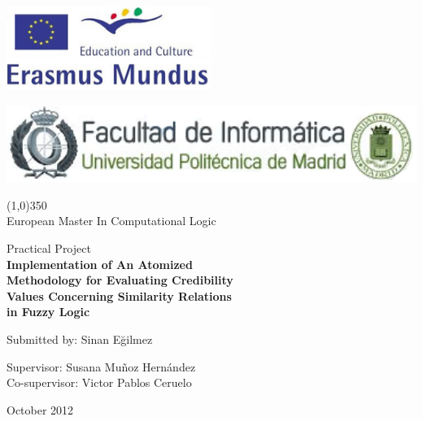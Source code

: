 
\begin{titlepage}
\centering

\includegraphics[width=0.5\textwidth]{erasmusMundus.png}

\includegraphics[width=1\textwidth]{logofi.png}
\begin{center}
\line(1,0){350}\\
European Master In Computational Logic
\end{center}

\vfill



{\large Practical Project}\\
\vspace{1cm}
{\huge {\sffamily\bfseries Implementation of An Atomized} } \\
\vspace{0.3cm}
{\huge{ \sffamily\bfseries Methodology for Evaluating Credibility} } \\
\vspace{0.3cm}
{\huge{ \sffamily\bfseries  Values Concerning Similarity Relations} }\\
\vspace{0.3cm}
{\huge{ \sffamily\bfseries  in Fuzzy Logic} }

\vfill

{\Large Submitted by: Sinan E\u{g}ilmez}

\vspace{1cm}
{\Large Supervisor: Susana Mu\~noz Hern\'andez }\\
{\Large Co-supervisor: Victor Pablos Ceruelo } \\
\vspace{1cm}

{\Large October 2012}
\cleardoublepage
\end{titlepage}